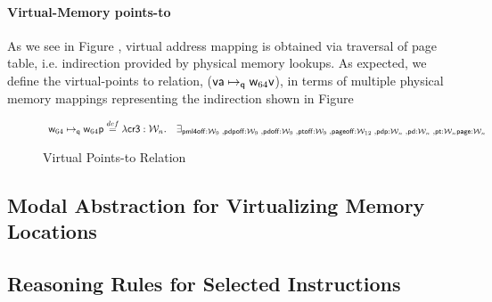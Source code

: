 \paragraph{Virtual-Memory points-to} As we see in Figure , virtual address mapping is obtained via traversal of page table, i.e. indirection provided by physical memory lookups. As expected, we define the virtual-points to relation, ($\mathsf{va}\mapsto_{\mathsf{q}}{\mathsf{w}_{64}}\mathsf{v}$), in terms of multiple physical memory mappings representing the indirection shown in Figure 
\begin{figure*}
\[
\begin{array}{cl}
  \mathsf{w}_{64}\mapsto_{\mathsf{q}}{\mathsf{w}_{64}}\mathsf{p} \stackrel{def}{=} \lambda \mathsf{cr3}:\mathcal{W}_n.
  & \exists_{ \mathsf{pml4off}:\mathcal{W}_{9} \;, \mathsf{pdpoff}:\mathcal{W}_{9} \;, \mathsf{pdoff}:\mathcal{W}_{9} \;, \mathsf{ptoff}:\mathcal{W}_{9} \;, \mathsf{pageoff}:\mathcal{W}_{12} \;, \mathsf{pdp}:\mathcal{W}_n \;, \mathsf{pd}:\mathcal{W}_n \;, \mathsf{pt}:\mathcal{W}_n \mathsf{page}:\mathcal{W}_n   }
\end{array}
\]
\caption{Virtual Points-to Relation}
  \label{fig:virtualpointsto}
\end{figure*}

\begin{comment}
   Definition virt_mapsto (a:word 64) (v:word 64) (q:Qp) : word 64 -> iProp Σ :=
λ (cr:word 64) ,
     ( ⌜ aligned a ⌝ ∗
         ∃ (l3 l2 l1 page w :word 64) (pageoff:word 12) (l4off l3off l2off l1off:word 9) ,
           ⌜ (WordImpl.concat (wzero 16) (WordImpl.concat l4off (WordImpl.concat l3off (WordImpl.concat l2off (WordImpl.concat l1off pageoff))))) = a ⌝ ∗
                          (natToWord 64 ((wordToNat l4)+(8*(wordToNat l4off)))) ↦p{q} (l3  ^|  (natToWord 64 3)) ∗
                          (natToWord 64 ((wordToNat l3)+(8*(wordToNat l3off)))) ↦p{q} (l2  ^|  (natToWord 64 3)) ∗
                          (natToWord 64 ((wordToNat l2)+(8*(wordToNat l2off)))) ↦p{q} ( l1  ^|  (natToWord 64 3)) ∗
                          (natToWord 64 ((wordToNat l2)+(8*(wordToNat l1off)))) ↦p{q} ( page  ^|  (natToWord 64 3)) ∗
                          (natToWord 64 ((wordToNat page) +(wordToNat pageoff))) ↦p v )%
\end{comment}

\subsection{Modal Abstraction for Virtualizing Memory Locations}
\label{sec:modallocationvirtualization}


\subsection{Reasoning Rules for Selected Instructions}
\label{sec:reasoning}


